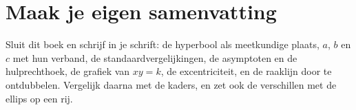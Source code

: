 
\begin{oefeningen}




\end{oefeningen}


\ifzelfstudie
\section*{Maak je eigen samenvatting}
Sluit dit boek en schrijf in je schrift: de hyperbool als meetkundige plaats, $a$, $b$ en $c$ met hun verband, de standaardvergelijkingen, de asymptoten en de hulprechthoek, de grafiek van $xy = k$, de excentriciteit, en de raaklijn door te ontdubbelen. Vergelijk daarna met de kaders, en zet ook de verschillen met de ellips op een rij.
\fi
